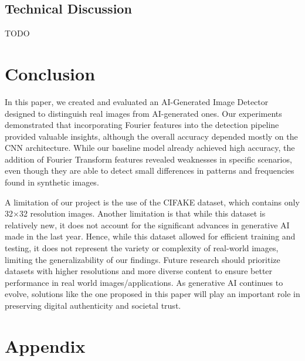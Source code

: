 \subsection{Technical Discussion}

TODO


\section{Conclusion}

In this paper, we created and evaluated an AI-Generated Image Detector designed to distinguish real images from AI-generated ones. Our experiments demonstrated that incorporating Fourier features into the detection pipeline provided valuable insights, although the overall accuracy depended mostly on the CNN architecture. While our baseline model already achieved high accuracy, the addition of Fourier Transform features revealed weaknesses in specific scenarios, even though they are able to detect small differences in patterns and frequencies found in synthetic images.

A limitation of our project is the use of the CIFAKE dataset, which contains only 32×32 resolution images. Another limitation is that while this dataset is relatively new, it does not account for the significant advances in generative AI made in the last year. Hence, while this dataset allowed for efficient training and testing, it does not represent the variety or complexity of real-world images, limiting the generalizability of our findings. Future research should prioritize datasets with higher resolutions and more diverse content to ensure better performance in real world images/applications. As generative AI continues to evolve, solutions like the one proposed in this paper will play an important role in preserving digital authenticity and societal trust.




{\small


}

\vspace{0.2cm}
\section*{Appendix}

\vspace{0.3cm}

